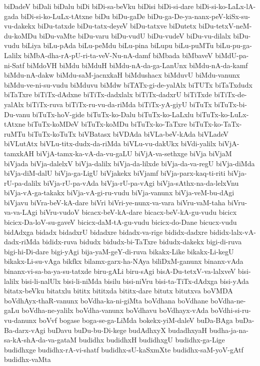 {biDadeV
biDali
biDalu
biDi
biDi-sa-beVku
biDisi
biDi-si-dare
biDi-si-ko-LaLx-lA-gada
biDi-si-ko-LuLx-tAtxne
biDu
biDu-gaDe
biDu-ga-De-ya-nanx-peV-kiSx-su-vu-dakekx
biDu-tatxde
biDu-tatx-deyeV
biDu-tatxve
biDutetx
biDu-tetxV-neM-du-koMDu
biDu-vaMte
biDu-varu
biDu-vudU
biDu-vudeV
biDu-vu-dilalx
biDu-vudu
biLiya
biLu-pAda
biLu-peMdu
biLu-pina
biLupu
biLu-puMTu
biLu-pu-ga-Lalilx
biMbA-dha-rA-pU-ri-ta-veV-Nu-nA-damf
biMbada
biMbaveV
biMdU-pa-ni-Satf
biMdoVH
biMdu
biMduH
biMdu-nA-da-ga-LanUnx
biMdu-nA-da-kamf
biMdu-nA-dakw
biMdu-saM-jacnxkaH
biMdushacx
biMduvU
biMdu-vanunx
biMdu-ve-ni-su-vudu
biMduvu
biMdw
biTATx-gi-de-yalAlx
biTUTx
biTaTxdudx
biTaTxre
biTiTx-dAdxne
biTiTx-dadxlalx
biTiTx-dadxrU
biTiTxde
biTiTx-de-yalAlx
biTiTx-ruva
biTiTx-ru-vu-da-riMda
biTiTx-yA-giyU
biTuTx
biTuTx-bi-Du-vanu
biTuTx-hoV-gide
biTuTx-ko-Dalu
biTuTx-ko-LaLxlu
biTuTx-ko-LuLx-tAtxne
biTuTx-koMDeV
biTuTx-koMDu
biTuTx-ko-TaTxre
biTuTx-ko-TaTx-ruMTu
biTuTx-koTuTx
biVBatasx
biVDAda
biVLa-beV-kAda
biVLadeV
biVLutAtx
biVLu-titx-dudx-da-riMda
biVLu-vu-dakUkx
biVdi-yalilx
biVjA-tamxkAH
biVjA-tamx-ka-vA-da-vu-gaLU
biVjA-va-sethxge
biVja
biVjaM
biVjada
biVja-dalelxV
biVja-dalilx
biVja-da-lilxde
biVja-da-va-regU
biVja-diMda
biVja-diM-dalU
biVja-ga-LigU
biVjakekx
biVjamf
biVja-parx-kaq-ti-riti
biVja-rU-pa-dalilx
biVja-rU-pa-vAda
biVja-rU-pa-vAgi
biVja-sAthx-na-da-lelxVnu
biVja-vA-ga-takakx
biVja-vA-gi-ru-vudu
biVja-vanunx
biVja-veM-bu-dAgi
biVjavu
biVra-beV-kA-dare
biVri
biVri-ye-nunx-va-vara
biVru-vaM-taha
biVru-va-va-LAgi
biVru-vudoV
bicacx-beV-kA-dare
bicacx-beV-kA-gu-vudu
bicicx
bicicx-Da-loV-su-gaveV
bicicx-daM-tA-gu-vudu
bicicx-do-Dane
bicucx-vudu
bidAdxga
bidadx
bidadxrU
bidadxre
bidadx-va-rige
bididx-dadxre
bididx-lalx-vA-dadx-riMda
bididx-ruva
bidudx
bidudx-bi-TaTxre
bidudx-dakekx
bigi-di-ruva
bigi-hi-Di-dare
bigi-yAgi
bija-yaM-geY-di-ruva
bikakx-Like
bikakx-Li-kegU
bikakx-Li-su-vAga
bikfkx
bilamx-garx-ha-NAya
biliDxM-ganunx
binanx-vAda
binanx-vi-sa-ba-ya-su-tatxde
biru-gALi
biru-sAgi
bisA-Du-tetxV-va-lalxveV
bisi-lalilx
bisi-li-nalUlx
bisi-li-niMda
bisilu
bisi-niVru
bisi-ta-TiTx-dAdxga
bisi-yAda
bitatx-beVku
bitatxlu
bititx
bititxda
bititx-dare
bitutx
bitutxva
boVMDA
boVdhAyx-thaR-vanunx
boVdha-ka-ni-giMta
boVdhana
boVdhane
boVdha-ne-gaLu
boVdha-ne-yalilx
boVdha-vanunx
boVdhavu
boVdhayx-vAda
boVdhi-si-ru-vu-danunx
boVvf
bogase
boga-se-ga-LiMda
bokekx-yiM-daleV
buDa-BAga
buDa-Ba-darx-vAgi
buDavu
buDu-bu-Di-kege
budAdhxyX
budadhxyaH
budha-ja-na-sa-kA-shA-da-va-gataM
budidhx
budidhxH
budidhxgU
budidhx-ga-Lige
budidhxge
budidhx-rA-vi-shatf
budidhx-sU-kaSxmXte
budidhx-saM-yoV-gAtf
budidhx-vaMta
}
